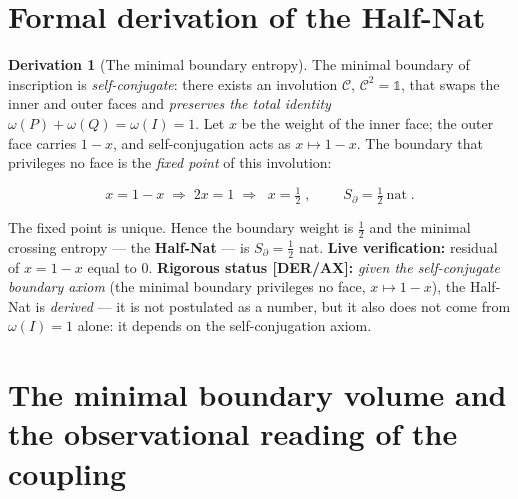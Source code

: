 \documentclass[11pt]{article}
\theoremstyle{definition}\newtheorem{deriv}{Derivation}
\begin{document}
\section{Formal derivation of the Half-Nat}

\begin{deriv}[The minimal boundary entropy]

The minimal boundary of inscription is \emph{self-conjugate}: there exists an involution $\mathcal{C}$, $\mathcal{C}^2=\mathbb{1}$, that swaps the inner and outer faces and \emph{preserves the total identity} $\omega(P)+\omega(Q)=\omega(I)=1$. Let $x$ be the weight of the inner face; the outer face carries $1-x$, and self-conjugation acts as $x\mapsto 1-x$. The boundary that privileges no face is the \emph{fixed point} of this involution:

\begin{equation}x=1-x\;\Longrightarrow\;2x=1\;\Longrightarrow\;\boxed{\;x=\tfrac12\;},\qquad\boxed{\;S_\partial=\tfrac12\ \text{nat}\;}.\end{equation}

The fixed point is unique. Hence the boundary weight is $\tfrac12$ and the minimal crossing entropy --- the \textbf{Half-Nat} --- is $S_\partial=\tfrac12$ nat. \textbf{Live verification:} residual of $x=1-x$ equal to $0$. \textbf{Rigorous status \textsf{[DER/AX]}:} \emph{given the self-conjugate boundary axiom} (the minimal boundary privileges no face, $x\mapsto1-x$), the Half-Nat is \emph{derived} --- it is not postulated as a number, but it also does not come from $\omega(I)=1$ alone: it depends on the self-conjugation axiom.\end{deriv}

\section{The minimal boundary volume and the observational reading of the coupling}
\end{document}
